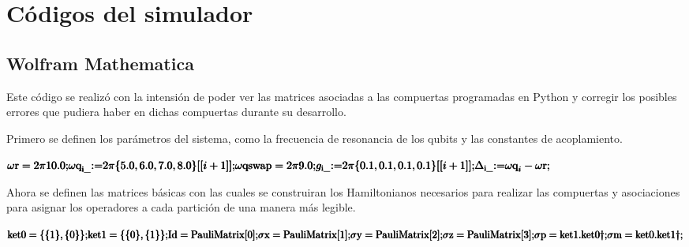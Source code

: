 \chapter{Códigos del simulador}

\section{Wolfram Mathematica}

Este código se realizó con la intensión de poder ver las matrices asociadas a las compuertas programadas en Python y corregir los posibles errores que pudiera haber en dichas compuertas durante su desarrollo.

Primero se definen los parámetros del sistema, como la frecuencia de resonancia de los qubits y las constantes de acoplamiento.

\begin{doublespace}
\noindent\(\pmb{\text{$\omega $r}=2\pi  10.0;}\\
\pmb{\text{$\omega $q}_{\text{i$\_$}}\text{:=}2\pi \{5.0,6.0,7.0,8.0\}[[i+1]];}\\
\pmb{\text{$\omega $qswap}=2\pi  9.0;}\\
\pmb{g_{\text{i$\_$}}\text{:=}2\pi \{0.1,0.1,0.1,0.1\}[[i+1]];}\\
\pmb{\Delta _{\text{i$\_$}}\text{:=}\text{$\omega $q}_i-\text{$\omega $r};}\)
\end{doublespace}

Ahora se definen las matrices básicas con las cuales se construiran los Hamiltonianos necesarios para realizar las compuertas y asociaciones para asignar los operadores a cada partición de una manera más legible.

\begin{doublespace}
\noindent\(\pmb{\text{ket0}=\{\{1\},\{0\}\};}\\
\pmb{\text{ket1}=\{\{0\},\{1\}\};}\\
\pmb{\text{Id}=\text{PauliMatrix}[0];}\\
\pmb{\text{$\sigma $x}=\text{PauliMatrix}[1];}\\
\pmb{\text{$\sigma $y}=\text{PauliMatrix}[2];}\\
\pmb{\text{$\sigma $z}=\text{PauliMatrix}[3];}\\
\pmb{\text{$\sigma $p}=\text{ket1}.\text{ket0}\dagger;}\\
\pmb{\text{$\sigma $m}=\text{ket0}.\text{ket1}\dagger;}\\ \)
\end{doublespace}

